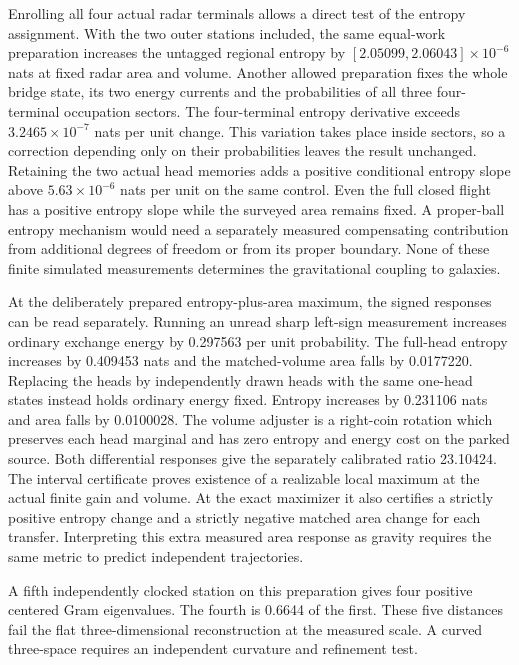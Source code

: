 \documentclass[11pt]{article}
\begin{document}
Enrolling all four actual radar terminals allows a direct test of the
entropy assignment. With the two outer stations included, the same
equal-work preparation increases the untagged regional entropy by
$[2.05099,2.06043]\times10^{-6}$ nats at fixed radar area and volume.
Another allowed preparation fixes the whole bridge state, its two energy
currents and the probabilities of all three four-terminal occupation
sectors. The four-terminal entropy derivative exceeds
$3.2465\times10^{-7}$ nats per unit change. This variation takes place
inside sectors, so a correction depending only on their probabilities
leaves the result unchanged. Retaining the two actual head memories adds a positive conditional
entropy slope above $5.63\times10^{-6}$ nats per unit on the same
control. Even the full closed flight has a positive entropy slope
while the surveyed area remains fixed. A proper-ball entropy mechanism would need a
separately measured compensating contribution from additional degrees of
freedom or from its proper boundary. None of these finite simulated
measurements determines the gravitational coupling to galaxies.

At the deliberately prepared entropy-plus-area maximum, the signed
responses can be read separately. Running an unread sharp
left-sign measurement increases ordinary exchange energy by 0.297563
per unit probability. The full-head entropy increases by 0.409453 nats
and the matched-volume area falls by 0.0177220. Replacing the heads
by independently drawn heads with the same one-head states instead
holds ordinary energy fixed. Entropy increases by 0.231106 nats and
area falls by 0.0100028. The volume adjuster is a right-coin rotation
which preserves each head marginal and has zero entropy and energy
cost on the parked source. Both differential responses give the
separately calibrated ratio 23.10424. The interval certificate proves
existence of a realizable local maximum at the actual finite gain
and volume. At the exact maximizer it also certifies a strictly
positive entropy change and a strictly negative matched area change
for each transfer. Interpreting this extra measured area response as gravity
requires the same metric to predict independent trajectories.

A fifth independently clocked station on this preparation gives four
positive centered Gram eigenvalues. The fourth is 0.6644 of the
first. These five distances fail the flat three-dimensional
reconstruction at the measured scale. A curved three-space requires
an independent curvature and refinement test.
\end{document}
